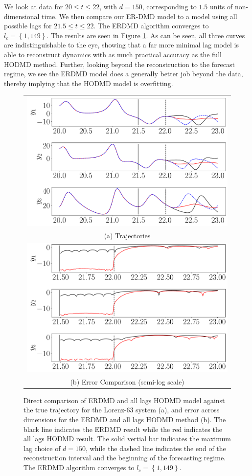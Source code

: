\documentclass[a4paper,11pt]{article}
\begin{document}
We look at data for $20\leq t \leq 22$, with $d=150$, corresponding to $1.5$ units of non-dimensional time.  We then compare our ER-DMD model to a model using all possible lags for $21.5\leq t \leq 22$.  The ERDMD algorithm converges to $l_{c}=\left\{1,149\right\}$.  The results are seen in Figure \ref{fig:lorenz_compare_d_150}.  As can be seen, all three curves are indistinguishable to the eye, showing that a far more minimal lag model is able to reconstruct dynamics with as much practical accuracy as the full HODMD method.  Further, looking beyond the reconstruction to the forecast regime, we see the ERDMD model does a generally better job beyond the data, thereby implying that the HODMD model is overfitting.  
\begin{figure}[!h]
\centering
\begin{tabular}{c}
\includegraphics[width=.8\textwidth]{Lorenz_compare_w_mx_lag_150}\\
(a) Trajectories\\
\includegraphics[width=.8\textwidth]{Lorenz_error_compare_w_mx_lag_150}\\
(b) Error Comparison (semi-log scale)
\end{tabular}
\caption{Direct comparison of ERDMD and all lags HODMD model against the true trajectory for the Lorenz-63 system (a), and error across dimensions for the ERDMD and all lags HODMD method (b).  The black line indicates the ERDMD result while the red indicates the all lags HODMD result.  The solid vertial bar indicates the maximum lag choice of $d=150$, while the dashed line indicates the end of the reconstruction interval and the beginning of the forecasting regime. The ERDMD algorithm converges to $l_{c}=\left\{1,149\right\}$.}
\label{fig:lorenz_compare_d_150}
\end{figure}
\end{document}
